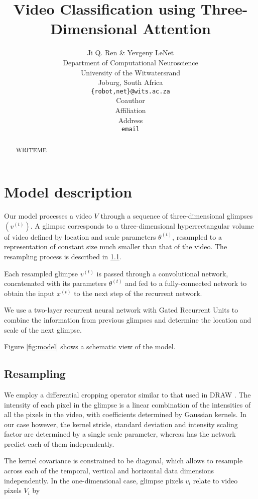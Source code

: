 \documentclass{article} %
\title{Video Classification using Three-Dimensional Attention}
\author{
Ji Q. Ren \& Yevgeny LeNet \\
Department of Computational Neuroscience \\
University of the Witwatersrand \\
Joburg, South Africa \\
\texttt{\{robot,net\}@wits.ac.za} \\
\AND
Coauthor \\
Affiliation \\
Address \\
\texttt{email}
}
\begin{document}
\maketitle

\begin{abstract}
WRITEME
\end{abstract}

\section{Model description}

Our model processes a video $V$ through a sequence of three-dimensional glimpses $\left(v^{(t)}\right)$.
A glimpse corresponds to a three-dimensional hyperrectangular volume of video defined by location and scale parameters $\theta^{(t)}$, resampled to a representation of constant size much smaller than that of the video.
The resampling process is described in \ref{sec:resampling}.

Each resampled glimpse $v^{(t)}$ is passed through a convolutional network, concatenated with its parameters $\theta^{(t)}$ and fed to a fully-connected network to obtain the input $x^{(t)}$ to the next step of the recurrent network.

We use a two-layer recurrent neural network with Gated Recurrent Units\cite{Cho2014} to combine the information from previous glimpses and determine the location and scale of the next glimpse.

Figure \ref{fig:model} shows a schematic view of the model.

\subsection{Resampling}
\label{sec:resampling}

We employ a differential cropping operator similar to that used in DRAW \cite{draw}.
The intensity of each pixel in the glimpse is a linear combination of the intensities of all the pixels in the video, with coefficients determined by Gaussian kernels.
In our case however, the kernel stride, standard deviation and intensity scaling factor are determined by a single scale parameter, whereas \cite{draw} has the network predict each of them independently.

The kernel covariance is constrained to be diagonal, which allows to resample across each of the temporal, vertical and horizontal data dimensions independently.
In the one-dimensional case, glimpse pixels $v_i$ relate to video pixels $V_i$ by
\end{document}
